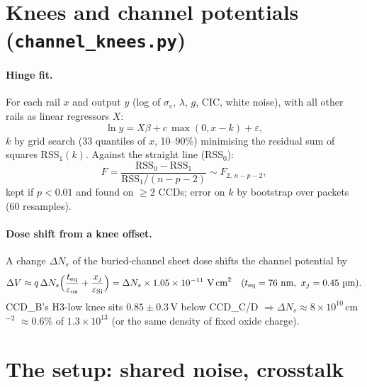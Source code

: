 \documentclass[10pt,a4paper]{article}
\newcommand{\code}[1]{\texttt{\small #1}}
\begin{document}
\section{Knees and channel potentials (\code{channel\_knees.py})}

\paragraph{Hinge fit.} For each rail $x$ and output $y$ (log of $\sigma_e$, $\lambda$, $g$, CIC, white noise), with all
other rails as linear regressors $X$:
\begin{equation}
\ln y=X\beta+c\,\max(0,x-k)+\varepsilon,
\end{equation}
$k$ by grid search (33 quantiles of $x$, 10--90\%) minimising the residual sum of squares $\text{RSS}_1(k)$. Against the
straight line ($\text{RSS}_0$):
\begin{equation}
F=\frac{\text{RSS}_0-\text{RSS}_1}{\text{RSS}_1/(n-p-2)}\sim F_{2,\,n-p-2},
\end{equation}
kept if $p<0.01$ and found on $\ge2$ CCDs; error on $k$ by bootstrap \cite{efron1979} over packets (60 resamples).

\paragraph{Dose shift from a knee offset.} A change $\Delta N_s$ of the buried-channel sheet dose shifts the channel
potential by
\begin{equation}
\Delta V\approx q\,\Delta N_s\Big(\frac{t_{\rm eq}}{\varepsilon_{\rm ox}}+\frac{x_j}{\varepsilon_{\rm Si}}\Big)
=\Delta N_s\times1.05\times10^{-11}\ \text{V\,cm}^2\quad(t_{\rm eq}=76\ \text{nm},\ x_j=0.45\ \text{\textmu m}).
\end{equation}
CCD\_B's H3-low knee sits $0.85\pm0.3$\,V below CCD\_C/D $\Rightarrow\Delta N_s\approx8\times10^{10}$\,cm$^{-2}$
$\approx0.6\%$ of $1.3\times10^{13}$ (or the same density of fixed oxide charge).

\section{The setup: shared noise, crosstalk}
\end{document}
